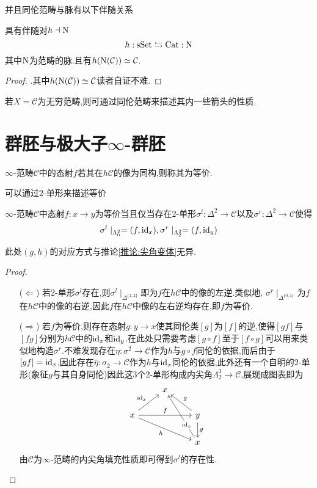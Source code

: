 并且同伦范畴与脉有以下伴随关系
\begin{proposition}\label{命题:h与N相伴随}
    具有伴随对$h \dashv \operatorname{N}$
    \[
        h: \operatorname{sSet} \leftrightarrows \operatorname{Cat}:\operatorname{N}
    \]
    其中$\operatorname{N}$为范畴的脉.且有$h(\operatorname{N}(\mathcal{C}))\simeq \mathcal{C}$.
\end{proposition}
\begin{proof}\parencite[Proposition 1.2.18]{Land}.其中$h(\operatorname{N}(\mathcal{C}))\simeq \mathcal{C}$读者自证不难.\end{proof}
若$X = \mathcal{C}$为无穷范畴,则可通过同伦范畴来描述其内一些箭头的性质.
\section{群胚与极大子$\infty$-群胚}
\begin{definition}[等价]
    $\infty$-范畴$\mathcal{C}$中的态射$f$若其在$h\mathcal{C}$的像为同构,则称其为等价.
\end{definition}
可以通过$2$-单形来描述等价
\begin{proposition}\label{命题:2-单形描述等价}
    $\infty$-范畴$\mathcal{C}$中态射$f: x \to y$为等价当且仅当存在$2$-单形$\sigma^l : \Delta^2 \to \mathcal{C}$以及$\sigma^r : \Delta^2 \to \mathcal{C}$使得
    \[
    \sigma^l\mid_{\Lambda_0^2} = (f,\mathrm{id}_x), \sigma^r \mid_{\Lambda_{2}^2} = (f,\mathrm{id}_y)
    \]
\end{proposition}
此处$(g,h)$的对应方式与推论\ref{推论:尖角变体}无异.
\begin{proof}
\begin{enumerate}
    \item[($\Leftarrow$)] 若$2$-单形$\sigma^l$存在,则$\sigma^l\mid_{\Delta^{\{1,2\}}}$即为$f$在$h\mathcal{C}$中的像的左逆.类似地, $\sigma^r\mid_{\Delta^{\{0,1\}}}$为$f$在$h\mathcal{C}$中的像的右逆,因此$f$在$h\mathcal{C}$中像的左右逆均存在,即$f$为等价.
    \item[($\Rightarrow$)] 若$f$为等价,则存在态射$g: y \to x$使其同伦类$[g]$为$[f]$的逆,使得$[gf]$与$[fg]$分别为$h\mathcal{C}$中的$\mathrm{id}_x$和$\mathrm{id}_y$.在此处只需要考虑$[g\circ f]$至于$[f\circ g]$可以用来类似地构造$\sigma^r$.不难发现存在$\eta : \sigma^2 \to \mathcal{C}$作为$h$与$g\circ f$同伦的依据,而后由于$[gf] = \mathrm{id}_x$,因此存在$\hat{\eta}: \sigma_2 \to \mathcal{C}$作为$h$与$\mathrm{id}_x$同伦的依据,此外还有一个自明的$2$-单形(象征$g$与其自身同伦)因此这$3$个$2$-单形构成内尖角$\Lambda_2^3 \to \mathcal{C}$,展现成图表即为
    \[\begin{tikzcd}
	& x \\
	x && y \\
	&& x
	\arrow["{\identity_x}", from=2-1, to=1-2]
	\arrow["f", from=2-1, to=2-3]
	\arrow["h"', from=2-1, to=3-3]
	\arrow["g"', from=2-3, to=1-2]
	\arrow["g", from=2-3, to=3-3]
	\arrow["{\identity_x}"{description, pos=0.3}, from=3-3, to=1-2]
    \end{tikzcd}\]
    由$\mathcal{C}$为$\infty$-范畴的内尖角填充性质即可得到$\sigma^l$的存在性.
\end{enumerate}
   
\end{proof}
